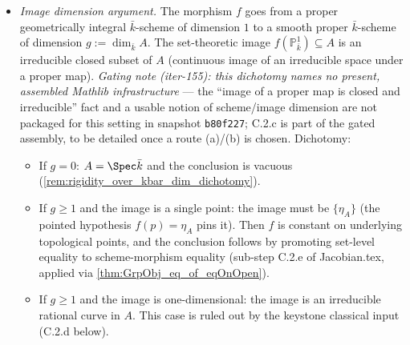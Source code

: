 \begin{itemize}
  \item[\textbf{(C.2.c)}] \emph{Image dimension argument.} The morphism \(f\) goes from a proper geometrically integral \(\bar k\)-scheme of dimension \(1\) to a smooth proper \(\bar k\)-scheme of dimension \(g := \dim_{\bar k} A\). The set-theoretic image \(f(\mathbb P^1_{\bar k}) \subseteq A\) is an irreducible closed subset of \(A\) (continuous image of an irreducible space under a proper map). \emph{Gating note (iter-155): this dichotomy names no present, assembled Mathlib infrastructure} --- the ``image of a proper map is closed and irreducible'' fact and a usable notion of scheme/image dimension are not packaged for this setting in snapshot \texttt{b80f227}; C.2.c is part of the gated assembly, to be detailed once a route (a)/(b) is chosen. Dichotomy:
  \begin{itemize}
    \item If \(g = 0\): \(A = \Spec \bar k\) and the conclusion is vacuous (\cref{rem:rigidity_over_kbar_dim_dichotomy}).
    \item If \(g \geq 1\) and the image is a single point: the image must be \(\{\eta_A\}\) (the pointed hypothesis \(f(p) = \eta_A\) pins it). Then \(f\) is constant on underlying topological points, and the conclusion follows by promoting set-level equality to scheme-morphism equality (sub-step C.2.e of Jacobian.tex, applied via \cref{thm:GrpObj_eq_of_eqOnOpen}).
    \item If \(g \geq 1\) and the image is one-dimensional: the image is an irreducible rational curve in \(A\). This case is ruled out by the keystone classical input (C.2.d below).
  \end{itemize}


\end{itemize}
